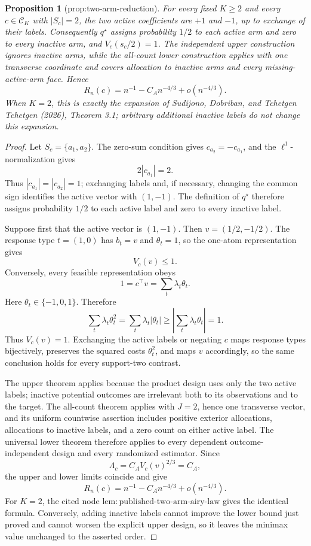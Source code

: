 \documentclass{article}
\newtheorem{proposition}{Proposition}
\begin{document}
\begin{proposition}[prop:two-arm-reduction]\label{prop:two-arm-reduction}
For every fixed \(K\ge2\) and every \(c\in\mathcal C_K\) with \(|S_c|=2\), the two active coefficients are \(+1\) and \(-1\), up to exchange of their labels.  Consequently \(q^\star\) assigns probability \(1/2\) to each active arm and zero to every inactive arm, and \(V_c(s_c/2)=1\).  The independent upper construction ignores inactive arms, while the all-count lower construction applies with one transverse coordinate and covers allocation to inactive arms and every missing-active-arm face.  Hence
\[
R_n(c)=n^{-1}-C_An^{-4/3}+o(n^{-4/3}).
\]
When \(K=2\), this is exactly the expansion of Sudijono, Dobriban, and Tchetgen Tchetgen (2026), Theorem 3.1; arbitrary additional inactive labels do not change this expansion.
\end{proposition}
\begin{proof}
Let \(S_c=\{a_1,a_2\}\).  The zero-sum condition gives
\(c_{a_2}=-c_{a_1}\), and the \(\ell^1\)-normalization gives
\[
2|c_{a_1}|=2.
\]
Thus \(|c_{a_1}|=|c_{a_2}|=1\); exchanging labels and, if necessary, changing the common sign identifies the active vector with \((1,-1)\).  The definition of \(q^\star\) therefore assigns probability \(1/2\) to each active label and zero to every inactive label.

Suppose first that the active vector is \((1,-1)\).  Then
\(v=(1/2,-1/2)\).  The response type \(t=(1,0)\) has
\(b_t=v\) and \(\theta_t=1\), so the one-atom representation gives
\[
V_c(v)\le1.
\tag{16}
\]
Conversely, every feasible representation obeys
\[
1=c^\top v=\sum_t\lambda_t\theta_t.
\tag{17}
\]
Here \(\theta_t\in\{-1,0,1\}\).  Therefore
\[
\sum_t\lambda_t\theta_t^2
=\sum_t\lambda_t|\theta_t|
\ge\left|\sum_t\lambda_t\theta_t\right|=1.
\tag{18}
\]
Thus \(V_c(v)=1\).  Exchanging the active labels or negating \(c\) maps response types bijectively, preserves the squared costs \(\theta_t^2\), and maps \(v\) accordingly, so the same conclusion holds for every support-two contrast.

The upper theorem applies because the product design uses only the two active labels; inactive potential outcomes are irrelevant both to its observations and to the target.  The all-count theorem applies with \(J=2\), hence one transverse vector, and its uniform countwise assertion includes positive exterior allocations, allocations to inactive labels, and a zero count on either active label.  The universal lower theorem therefore applies to every dependent outcome-independent design and every randomized estimator.  Since
\[
\Lambda_c=C_AV_c(v)^{2/3}=C_A,
\]
the upper and lower limits coincide and give
\[
R_n(c)=n^{-1}-C_An^{-4/3}+o(n^{-4/3}).
\]
For \(K=2\), the cited node
\(\mathrm{lem:published\text{-}two\text{-}arm\text{-}airy\text{-}law}\)
gives the identical formula.  Conversely, adding inactive labels cannot improve the lower bound just proved and cannot worsen the explicit upper design, so it leaves the minimax value unchanged to the asserted order.
\end{proof}
\end{document}
